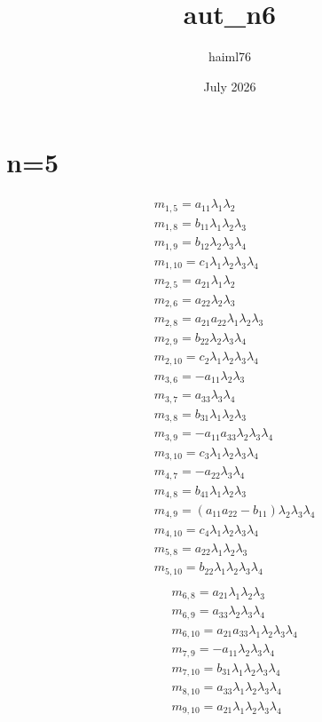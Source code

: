 \documentclass{article}
\title{aut_n6}
\author{haiml76 }
\date{July 2026}
\begin{document}
\section{n=5}
\begin{align*}
&m_{1,5}=a_{11} \lambda_{1} \lambda_{2}\\
&m_{1,8}=b_{11} \lambda_{1} \lambda_{2} \lambda_{3}\\
&m_{1,9}=b_{12} \lambda_{2} \lambda_{3} \lambda_{4}\\
&m_{1,10}=c_{1} \lambda_{1} \lambda_{2} \lambda_{3} \lambda_{4}\\
&m_{2,5}=a_{21} \lambda_{1} \lambda_{2}\\
&m_{2,6}=a_{22} \lambda_{2} \lambda_{3}\\
&m_{2,8}=a_{21} a_{22} \lambda_{1} \lambda_{2} \lambda_{3}\\
&m_{2,9}=b_{22} \lambda_{2} \lambda_{3} \lambda_{4}\\
&m_{2,10}=c_{2} \lambda_{1} \lambda_{2} \lambda_{3} \lambda_{4}\\
&m_{3,6}=-a_{11} \lambda_{2} \lambda_{3}\\
&m_{3,7}=a_{33} \lambda_{3} \lambda_{4}\\
&m_{3,8}=b_{31} \lambda_{1} \lambda_{2} \lambda_{3}\\
&m_{3,9}=-a_{11} a_{33} \lambda_{2} \lambda_{3} \lambda_{4}\\
&m_{3,10}=c_{3} \lambda_{1} \lambda_{2} \lambda_{3} \lambda_{4}\\
&m_{4,7}=-a_{22} \lambda_{3} \lambda_{4}\\
&m_{4,8}=b_{41} \lambda_{1} \lambda_{2} \lambda_{3}\\
&m_{4,9}={\left(a_{11} a_{22} - b_{11}\right)} \lambda_{2} \lambda_{3} \lambda_{4}\\
&m_{4,10}=c_{4} \lambda_{1} \lambda_{2} \lambda_{3} \lambda_{4}\\
&m_{5,8}=a_{22} \lambda_{1} \lambda_{2} \lambda_{3}\\
&m_{5,10}=b_{22} \lambda_{1} \lambda_{2} \lambda_{3} \lambda_{4}\\
\end{align*}
\begin{align*}
&m_{6,8}=a_{21} \lambda_{1} \lambda_{2} \lambda_{3}\\
&m_{6,9}=a_{33} \lambda_{2} \lambda_{3} \lambda_{4}\\
&m_{6,10}=a_{21} a_{33} \lambda_{1} \lambda_{2} \lambda_{3} \lambda_{4}\\
&m_{7,9}=-a_{11} \lambda_{2} \lambda_{3} \lambda_{4}\\
&m_{7,10}=b_{31} \lambda_{1} \lambda_{2} \lambda_{3} \lambda_{4}\\
&m_{8,10}=a_{33} \lambda_{1} \lambda_{2} \lambda_{3} \lambda_{4}\\
&m_{9,10}=a_{21} \lambda_{1} \lambda_{2} \lambda_{3} \lambda_{4}\\
\end{align*}
\newpage
\end{document}
